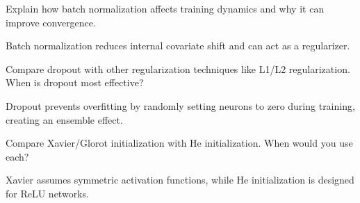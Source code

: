 \begin{exercisebox}[hard]
\begin{problem}
Explain how batch normalization affects training dynamics and why it can improve convergence.
\end{problem}
\begin{hintbox}
Batch normalization reduces internal covariate shift and can act as a regularizer.
\end{hintbox}
\end{exercisebox}


\begin{exercisebox}[hard]
\begin{problem}
Compare dropout with other regularization techniques like L1/L2 regularization. When is dropout most effective?
\end{problem}
\begin{hintbox}
Dropout prevents overfitting by randomly setting neurons to zero during training, creating an ensemble effect.
\end{hintbox}
\end{exercisebox}


\begin{exercisebox}[hard]
\begin{problem}
Compare Xavier/Glorot initialization with He initialization. When would you use each?
\end{problem}
\begin{hintbox}
Xavier assumes symmetric activation functions, while He initialization is designed for ReLU networks.
\end{hintbox}
\end{exercisebox}


